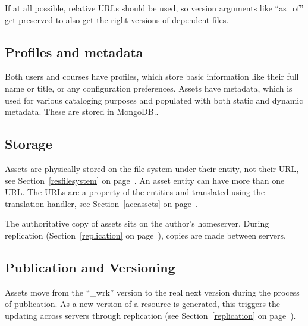 If at all possible, relative URLs should be used, so version arguments like ``as\_of'' get preserved to also get the right versions of dependent files.
\subsection{Profiles and metadata}
Both users and courses have profiles, which store basic information like their full name or title, or any configuration preferences. Assets have metadata, which is used for various cataloging purposes and populated with both static and dynamic metadata. These are stored in MongoDB..
\subsection{Storage}
Assets are physically stored on the file system under their entity, not their URL,  see Section~\ref{resfilesystem} on page~\pageref{resfilesystem}. An asset entity can have more than one URL. The URLs are a property of the entities and translated using the translation handler, see Section~\ref{accassets} on page~\pageref{accassets}.

The authoritative copy of assets sits on the author's homeserver. During replication (Section~\ref{replication} on page~\pageref{replication}), copies are made between servers.
\subsection{Publication and Versioning}
Assets move from the ``\_wrk'' version to the real next version during the process of publication.
 As a new version of a resource is generated, this triggers the updating across servers through replication (see Section~\ref{replication} on page~\pageref{replication}).
